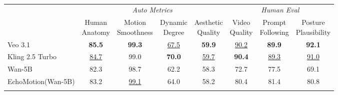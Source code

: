 \begin{table}[t]
\setlength\tabcolsep{3pt}
\centering 
\caption{}
\label{tab:sota_compare}

\small 

\begin{tabular}{l | cccc | ccc}
\Xhline{1.1pt}
\multirow{3}{*}{} & \multicolumn{4}{c|}{\textit{Auto Metrics}} & \multicolumn{3}{c}{\textit{Human Eval}} \\

\cline{2-8}

\shortstack{} & 
\shortstack{Human \\ Anatomy} &  
\shortstack{Motion \\ Smoothness} & 
\shortstack{Dynamic \\ Degree} & 
\shortstack{Aesthetic \\ Quality} & 
\shortstack{Video \\ Quality} & 
\shortstack{Prompt \\ Following} & 
\shortstack{Posture \\ Plausibility} \\
\hline
Veo 3.1 & \textbf{85.5} & \textbf{99.3} & \underline{67.5} & \textbf{59.9} & \underline{90.2} & \textbf{89.9} & \textbf{92.1} \\ 
Kling 2.5 Turbo & \underline{84.7} & 99.0 & \textbf{70.0} & \underline{59.7} & \textbf{90.4}  & \underline{89.3} & \underline{91.0} \\ 
\hline
Wan-5B & 82.3 & {98.7} & {62.2} & 58.3 & 72.7 & 77.5 & 69.1 \\
EchoMotion(Wan-5B) & 83.2 & \underline{99.1} & 64.0 & 58.2 & 80.4 & 81.4 & 80.8 \\
\Xhline{1.1pt}
\end{tabular}
\vspace{-3mm}
\end{table}

